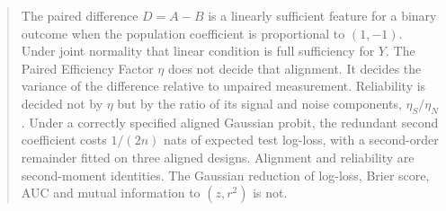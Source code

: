 \begin{abstract}
The paired difference $D=A-B$ is a linearly sufficient feature for a binary outcome when the population coefficient is proportional to $(1,-1)$.
Under joint normality that linear condition is full sufficiency for $Y$.
The Paired Efficiency Factor $\eta$ does not decide that alignment.
It decides the variance of the difference relative to unpaired measurement.
Reliability is decided not by $\eta$ but by the ratio of its signal and noise components, $\eta_S/\eta_N$.
Under a correctly specified aligned Gaussian probit, the redundant second coefficient costs $1/(2n)$ nats of expected test log-loss, with a second-order remainder fitted on three aligned designs.
Alignment and reliability are second-moment identities.
The Gaussian reduction of log-loss, Brier score, AUC and mutual information to $(z,r^2)$ is not.
\end{abstract}
